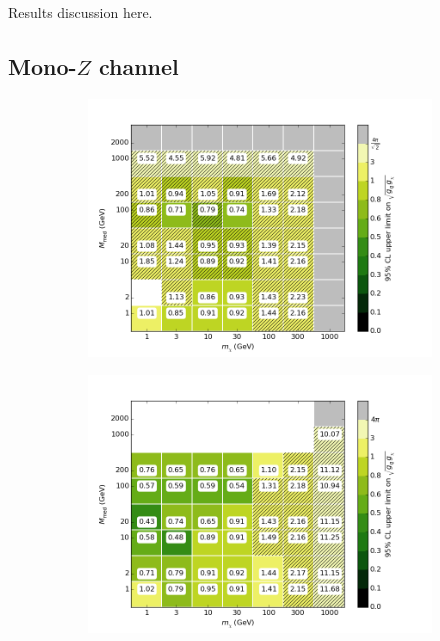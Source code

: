 Results discussion here.

\subsection{Mono-$Z$ channel}

\begin{figure}[h]
  \centering
    \begin{subfigure}[t]{0.495\textwidth}
      \centering
      \includegraphics[width=1.\textwidth]{figures/grid_allpoints_SVD_rat05.png}
      \caption{}
    \end{subfigure}
    \begin{subfigure}[t]{0.495\textwidth}
      \centering
      \includegraphics[width=1.\textwidth]{figures/grid_allpoints_SVD_rat1.png}

\end{subfigure}
\end{figure}
